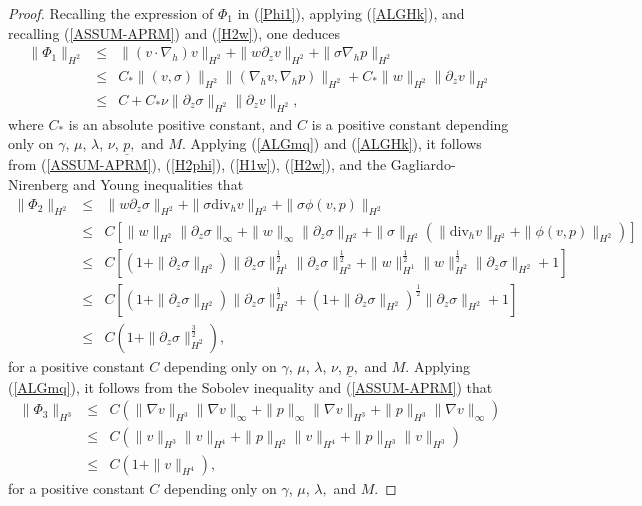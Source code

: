 \documentclass[12pt,reqno]{amsart}
\numberwithin{equation}{section}
\begin{document}
\begin{proof}
Recalling the
expression of $\Phi_1$ in (\ref{Phi1}), applying (\ref{ALGHk}), and
recalling (\ref{ASSUM-APRM}) and (\ref{H2w}), one deduces
\begin{eqnarray}
  \|\Phi_1\|_{H^2}&\leq&\|(v\cdot\nabla_h)v\|_{H^2}+\|w\partial_zv\|_{H^2}+\|\sigma\nabla_hp\|_{H^2}\nonumber\\
  &\leq&C_*\|(v,\sigma)\|_{H^2}\|(\nabla_hv,\nabla_hp)\|_{H^2}+C_*\|w\|_{H^2}\|\partial_zv\|_{H^2}\nonumber\\
  &\leq&C+C_*\nu\|\partial_z\sigma\|_{H^2}\|\partial_zv\|_{H^2},\label{H2Phi1}
\end{eqnarray}
where $C_*$ is an absolute positive constant, and $C$ is a positive constant depending only on $\gamma$, $\mu$, $\lambda$, $\nu$,
$\underline p,$ and $M$.
Applying (\ref{ALGmq}) and (\ref{ALGHk}), it
follows from (\ref{ASSUM-APRM}), (\ref{H2phi}), (\ref{H1w}), (\ref{H2w}), and the Gagliardo-Nirenberg and Young inequalities that
\begin{eqnarray}
  \|\Phi_2\|_{H^2}&\leq&\|w\partial_z\sigma\|_{H^2}+\|\sigma\text{div}_hv\|_{H^2}+\|\sigma\phi(v,p)\|_{H^2}\nonumber\\
  &\leq&C[\|w\|_{H^2}\|\partial_z\sigma\|_\infty+\|w\|_\infty\|\partial_z\sigma\|_{H^2}+\|\sigma\|_{H^2}(\|\text{div}_hv\|_{H^2}+
  \|\phi(v,p)\|_{H^2})]\nonumber\\
  &\leq&C\left[(1+\|\partial_z\sigma\|_{H^2})\|\partial_z\sigma\|_{H^1}^\frac12\|\partial_z\sigma\|_{H^2}^\frac12+\|w\|_{H^1}^\frac12\|w\|_{H^2}^\frac12
  \|\partial_z\sigma\|_{H^2}+1\right]\nonumber\\
  &\leq&C\left[(1+\|\partial_z\sigma\|_{H^2})\|\partial_z\sigma\|_{H^2}^\frac12+(1+\|\partial_z\sigma\|_{H^2})^\frac12
  \|\partial_z\sigma\|_{H^2}+1\right]\nonumber\\
  &\leq& C\left(1+\|\partial_z\sigma\|_{H^2}^\frac32\right), \label{H2Phi2}
\end{eqnarray}
for a positive constant $C$ depending only on $\gamma$, $\mu$, $\lambda$, $\nu$, $\underline p,$ and $M$.
Applying (\ref{ALGmq}), it follows from the Sobolev inequality
and (\ref{ASSUM-APRM}) that
\begin{eqnarray}
  \|\Phi_3\|_{H^3}&\leq&C(\|\nabla v\|_{H^3}\|\nabla v\|_\infty+\|p\|_\infty\|\nabla v\|_{H^3}+\|p\|_{H^3}\|\nabla v\|_\infty)\nonumber\\
  &\leq&C(\|v\|_{H^3}\|v\|_{H^4}+\|p\|_{H^2}\|v\|_{H^4}+\|p\|_{H^3}\|v\|_{H^3})\nonumber\\
  &\leq& C(1+\|v\|_{H^4}), \label{H3Phi3}
\end{eqnarray}
for a positive constant $C$ depending only on $\gamma$, $\mu$, $\lambda,$ and $M$.
\end{proof}
\end{document}
